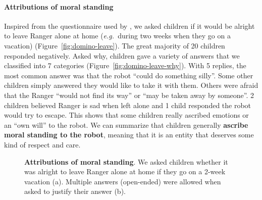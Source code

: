 \documentclass{sig-alternate}
\newcommand{\eg}{{\textit{e.g.~}}}
\begin{document}
\paragraph{Attributions of moral standing}

Inspired from the questionnaire used by \cite{kahn_jr._robotic_2006}, we asked
children if it would be alright to leave Ranger alone at home (\eg during two
weeks when they go on a vacation) (Figure~\ref{fig:domino-leave}). The great
majority of 20 children responded negatively. Asked why, children gave a variety
of answers that we classified into 7 categories
(Figure~\ref{fig:domino-leave-why}). With 5 replies, the most common answer was
that the robot ``could do something silly''. Some other children simply answered
they would like to take it with them. Others were afraid that the Ranger ``would
not find its way'' or ``may be taken away by someone''. 2 children believed
Ranger is sad when left alone and 1 child responded the robot would try to
escape. This shows that some children really ascribed emotions or an ``own
will'' to the robot.  We can summarize that children generally \textbf{ascribe
moral standing to the robot}, meaning that it is an entity that deserves some
kind of respect and care. 

\begin{figure}[!h]
    \centering 
    \caption[Attribution of Moral Standing]{\small \textbf{Attributions of moral
        standing}. We asked children whether it was alright to leave Ranger
        alone at home if they go on a 2-week vacation (a). Multiple answers
        (open-ended) were allowed when asked to justify their answer (b).}

    \label{fig:domino-leave-alone} 
\end{figure}		
\end{document}
